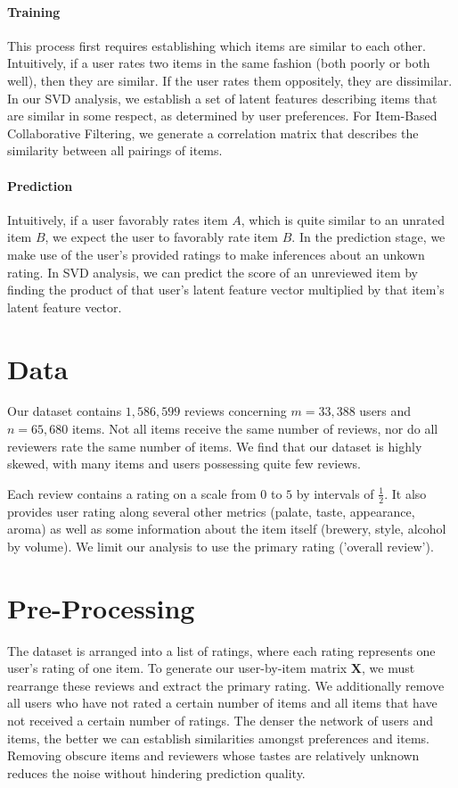 \documentclass[12pt]{article}
\begin{document}
\paragraph{Training} This process first requires establishing which items are similar to each other. Intuitively, if a user rates two items in the same fashion (both poorly or both well), then they are similar. If the user rates them oppositely, they are dissimilar. In our SVD analysis, we establish a set of latent features describing items that are similar in some respect, as determined by user preferences. For Item-Based Collaborative Filtering, we generate a correlation matrix that describes the similarity between all pairings of items.

\paragraph{Prediction} Intuitively, if a user favorably rates item $A$, which is quite similar to an unrated item $B$, we expect the user to favorably rate item $B$. In the prediction stage, we make use of the user's provided ratings to make inferences about an unkown rating. In SVD analysis, we can predict the score of an unreviewed item by finding the product of that user's latent feature vector multiplied by that item's latent feature vector.

\section{Data}
Our dataset contains $1,586,599$ reviews concerning $m = 33,388$ users and $n = 65,680$ items. Not all items receive the same number of reviews, nor do all reviewers rate the same number of items. We find that our dataset is highly skewed, with many items and users possessing quite few reviews.

Each review contains a rating on a scale from $0$ to $5$ by intervals of $\frac{1}{2}$. It also provides user rating along several other metrics (palate, taste, appearance, aroma) as well as some information about the item itself (brewery, style, alcohol by volume). We limit our analysis to use the primary rating ('overall review').

\section{Pre-Processing}
The dataset is arranged into a list of ratings, where each rating represents one user's rating of one item. To generate our user-by-item matrix $\mathbf{X}$, we must rearrange these reviews and extract the primary rating. We additionally remove all users who have not rated a certain number of items and all items that have not received a certain number of ratings. The denser the network of users and items, the better we can establish similarities amongst preferences and items. Removing obscure items and reviewers whose tastes are relatively unknown reduces the noise without hindering prediction quality.
\end{document}
